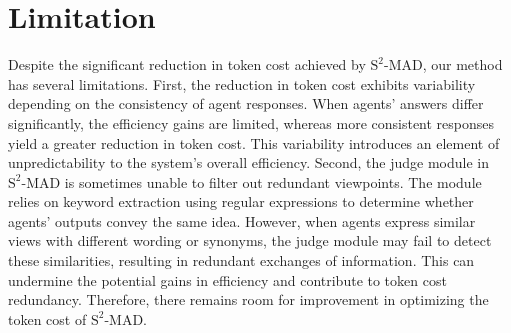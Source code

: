 \section{Limitation}
\label{sec:limitation}
Despite the significant reduction in token cost achieved by $\text{S}^2\text{-MAD}$, our method has several limitations. First, the reduction in token cost exhibits variability depending on the consistency of agent responses. When agents' answers differ significantly, the efficiency gains are limited, whereas more consistent responses yield a greater reduction in token cost. This variability introduces an element of unpredictability to the system's overall efficiency.
Second, the judge module in $\text{S}^2\text{-MAD}$ is sometimes unable to filter out redundant viewpoints. The module relies on keyword extraction using regular expressions to determine whether agents' outputs convey the same idea. However, when agents express similar views with different wording or synonyms, the judge module may fail to detect these similarities, resulting in redundant exchanges of information. This can undermine the potential gains in efficiency and contribute to token cost redundancy.
Therefore, there remains room for improvement in optimizing the token cost of $\text{S}^2\text{-MAD}$. 
